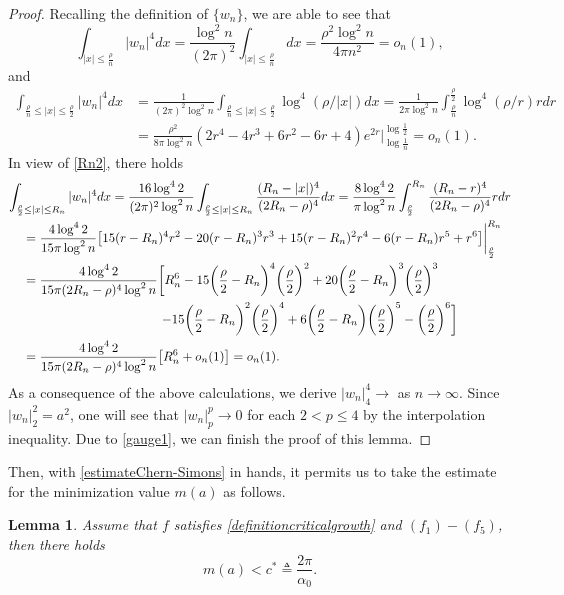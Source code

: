 \documentclass[11pt]{amsart}
\numberwithin{equation}{section}
\newtheorem{lemma}[theorem]{Lemma}
\theoremstyle{definition}
\begin{document}
\begin{proof}
Recalling the definition of $\{w_n\}$, we are able to see that
\[
\int_{|x|\leq\frac\rho n}|w_n|^4dx=\frac{\log^2n}{(2\pi)^2}\int_{|x|\leq\frac\rho n} dx=\frac{\rho^2\log^2n}{4\pi n^2}
=o_n(1),
\]
and
\begin{align*}
 \int_{\frac\rho n\leq |x|\leq\frac\rho 2}|w_n|^4dx &=\frac{1}{(2\pi)^2\log^2n}\int_{\frac\rho n\leq |x|\leq\frac\rho 2}
\log^4(\rho/|x|)dx= \frac{1}{ 2\pi \log^2n}\int_{\frac\rho n}^{\frac\rho2}\log^4(\rho/r)rdr \\
    & =\frac{\rho^2}{8\pi \log^2n}(2r^4-4r^3+6r^2-6r+4)e^{2r}\bigg|_{\log \frac1n}^{\log \frac12}=o_n(1).
\end{align*}
In view of \eqref{Rn2}, there holds
\[
\begin{gathered}
 \int_{\frac\rho 2\leq |x|\leq R_n}|w_n|^4dx  =\frac{16\log^42}{(2\pi)^2\log^2n}\int_{\frac\rho 2\leq |x|\leq R_n}
 \frac{(R_n-|x|)^4}{(2R_n-\rho)^4}dx= \frac{8\log^42}{ \pi \log^2n}\int_{\frac\rho 2}^{R_n}\frac{(R_n-r)^4}{(2R_n-\rho)^4}rdr \hfill\\
\ \ \ \  =\frac{4\log^42}{ 15\pi \log^2n}\big[15(r-R_n)^4r^2-20(r-R_n)^3r^3+15(r-R_n)^2r^4-6(r-R_n) r^5+r^6\big]\bigg|_{\frac\rho 2}^{R_n}\hfill\\
\ \ \ \  =\frac{4\log^42}{15\pi(2R_n-\rho)^4 \log^2n}\bigg[R_n^6-15\bigg(\frac\rho2-R_n\bigg)^4\bigg(\frac\rho2\bigg)^2+20\bigg(\frac\rho2-R_n\bigg)^3
\bigg(\frac\rho2\bigg)^3\hfill\\
\ \ \ \ \ \ \ \ \ \ \ \  \ \ \ \  \ \ \ \  \ \  \ \  \ \  \ \  \ \  \ \  \ \ \ \   -15\bigg(\frac\rho2-R_n\bigg)^2
\bigg(\frac\rho2\bigg)^4+6\bigg(\frac\rho2-R_n\bigg)\bigg(\frac\rho2\bigg)^5-\bigg(\frac\rho2\bigg)^6\bigg] \hfill\\
\ \ \ \  =\frac{4\log^42}{15\pi (2R_n-\rho)^4\log^2n}\big[R_n^6+o_n(1)\big]=o_n(1). \hfill\\
\end{gathered}
\]
As a consequence of the above calculations, we derive $|w_n|_4^4\to$ as $n\to\infty$.
Since $|w_n|_2^2=a^2$, one will see that $|w_n|_p^p\to0$ for each $2<p\leq 4$ by the interpolation inequality.
Due to \eqref{gauge1}, we can finish the proof of this lemma.
\end{proof}

Then, with \eqref{estimateChern-Simons} in hands, it permits us to take
 the estimate for the minimization value $m(a)$ as follows.


\begin{lemma}\label{estimate}
Assume that $f$ satisfies
\eqref{definitioncriticalgrowth} and $(f_1)-(f_5)$, then there holds
\begin{equation}\label{estimate1}
m(a)<c^*\triangleq\frac{2\pi}{\alpha_0}.
\end{equation}
\end{lemma}
\end{document}
